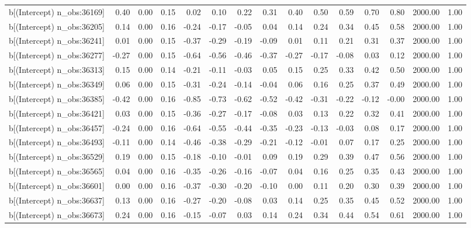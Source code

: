 \begin{table}[ht]
\begin{tabular}{rrrrrrrrrrrrrrr}
  b[(Intercept) n\_obs:36169] & 0.40 & 0.00 & 0.15 & 0.02 & 0.10 & 0.22 & 0.31 & 0.40 & 0.50 & 0.59 & 0.70 & 0.80 & 2000.00 & 1.00 \\ 
  b[(Intercept) n\_obs:36205] & 0.14 & 0.00 & 0.16 & -0.24 & -0.17 & -0.05 & 0.04 & 0.14 & 0.24 & 0.34 & 0.45 & 0.58 & 2000.00 & 1.00 \\ 
  b[(Intercept) n\_obs:36241] & 0.01 & 0.00 & 0.15 & -0.37 & -0.29 & -0.19 & -0.09 & 0.01 & 0.11 & 0.21 & 0.31 & 0.37 & 2000.00 & 1.00 \\ 
  b[(Intercept) n\_obs:36277] & -0.27 & 0.00 & 0.15 & -0.64 & -0.56 & -0.46 & -0.37 & -0.27 & -0.17 & -0.08 & 0.03 & 0.12 & 2000.00 & 1.00 \\ 
  b[(Intercept) n\_obs:36313] & 0.15 & 0.00 & 0.14 & -0.21 & -0.11 & -0.03 & 0.05 & 0.15 & 0.25 & 0.33 & 0.42 & 0.50 & 2000.00 & 1.00 \\ 
  b[(Intercept) n\_obs:36349] & 0.06 & 0.00 & 0.15 & -0.31 & -0.24 & -0.14 & -0.04 & 0.06 & 0.16 & 0.25 & 0.37 & 0.49 & 2000.00 & 1.00 \\ 
  b[(Intercept) n\_obs:36385] & -0.42 & 0.00 & 0.16 & -0.85 & -0.73 & -0.62 & -0.52 & -0.42 & -0.31 & -0.22 & -0.12 & -0.00 & 2000.00 & 1.00 \\ 
  b[(Intercept) n\_obs:36421] & 0.03 & 0.00 & 0.15 & -0.36 & -0.27 & -0.17 & -0.08 & 0.03 & 0.13 & 0.22 & 0.32 & 0.41 & 2000.00 & 1.00 \\ 
  b[(Intercept) n\_obs:36457] & -0.24 & 0.00 & 0.16 & -0.64 & -0.55 & -0.44 & -0.35 & -0.23 & -0.13 & -0.03 & 0.08 & 0.17 & 2000.00 & 1.00 \\ 
  b[(Intercept) n\_obs:36493] & -0.11 & 0.00 & 0.14 & -0.46 & -0.38 & -0.29 & -0.21 & -0.12 & -0.01 & 0.07 & 0.17 & 0.25 & 2000.00 & 1.00 \\ 
  b[(Intercept) n\_obs:36529] & 0.19 & 0.00 & 0.15 & -0.18 & -0.10 & -0.01 & 0.09 & 0.19 & 0.29 & 0.39 & 0.47 & 0.56 & 2000.00 & 1.00 \\ 
  b[(Intercept) n\_obs:36565] & 0.04 & 0.00 & 0.16 & -0.35 & -0.26 & -0.16 & -0.07 & 0.04 & 0.16 & 0.25 & 0.35 & 0.43 & 2000.00 & 1.00 \\ 
  b[(Intercept) n\_obs:36601] & 0.00 & 0.00 & 0.16 & -0.37 & -0.30 & -0.20 & -0.10 & 0.00 & 0.11 & 0.20 & 0.30 & 0.39 & 2000.00 & 1.00 \\ 
  b[(Intercept) n\_obs:36637] & 0.13 & 0.00 & 0.16 & -0.27 & -0.20 & -0.08 & 0.03 & 0.14 & 0.25 & 0.35 & 0.45 & 0.52 & 2000.00 & 1.00 \\ 
  b[(Intercept) n\_obs:36673] & 0.24 & 0.00 & 0.16 & -0.15 & -0.07 & 0.03 & 0.14 & 0.24 & 0.34 & 0.44 & 0.54 & 0.61 & 2000.00 & 1.00 \\ 

\end{tabular}
\end{table}
